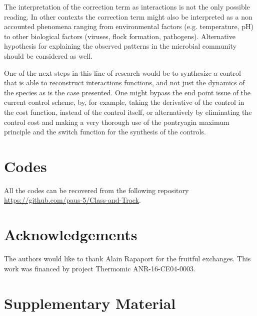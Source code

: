 \documentclass[3p,times]{elsarticle}
\begin{document}
The interpretation of the correction term as interactions is not the only possible reading. In other contexts the correction term might also be interpreted as a non accounted phenomena ranging from environmental factors (e.g. temperature, pH) to other biological factors (viruses, flock formation, pathogens). Alternative hypothesis for explaining the observed patterns in the microbial community should be considered as well. 

One of the next steps in this line of research would be to synthesize a control that is able to reconstruct interactions functions, and not just the dynamics of the species as is the case presented. One might bypass the end point issue of the current control scheme, by, for example, taking the derivative of the control in the cost function, instead of the control itself, or alternatively by eliminating the control cost and making a very thorough use of the pontryagin maximum principle and the switch function for the synthesis of the controls.


\section{Codes}

All the codes can be recovered from the following repository \url{https://github.com/paus-5/Class-and-Track}.
\section{Acknowledgements}
 The authors would like to thank Alain Rapaport for the fruitful exchanges. This work was financed by project Thermomic ANR-16-CE04-0003.

\section{Supplementary Material}
\end{document}
